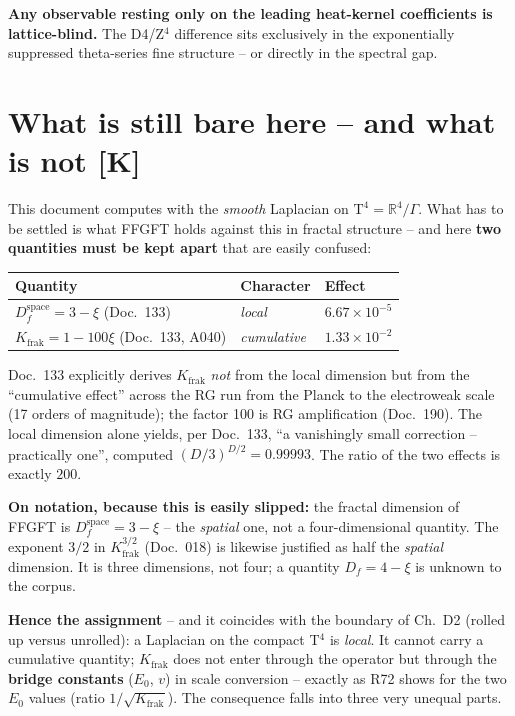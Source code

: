 \textbf{Any observable resting only on the leading heat-kernel
coefficients is lattice-blind.} The D4/Z$^4$ difference sits
exclusively in the exponentially suppressed theta-series fine
structure -- or directly in the spectral gap.

\chapter{What is still bare here -- and what is not [K]}

This document computes with the \emph{smooth} Laplacian on
$\text{T}^4 = \mathbb{R}^4/\Gamma$. What has to be settled is what
FFGFT holds against this in fractal structure -- and here
\textbf{two quantities must be kept apart} that are easily
confused:

\begin{center}
\begin{tabular}{lll}
\toprule
Quantity & Character & Effect \\
\midrule
$D_f^\text{space} = 3-\xi$ (Doc.~133) & \emph{local} &
  $6.67\times10^{-5}$ \\
$K_\text{frak} = 1-100\xi$ (Doc.~133, A040) & \emph{cumulative} &
  $1.33\times10^{-2}$ \\
\bottomrule
\end{tabular}
\end{center}

\noindent Doc.~133 explicitly derives $K_\text{frak}$ \emph{not}
from the local dimension but from the \enquote{cumulative effect}
across the RG run from the Planck to the electroweak scale (17
orders of magnitude); the factor 100 is RG amplification
(Doc.~190). The local dimension alone yields, per Doc.~133,
\enquote{a vanishingly small correction -- practically one},
computed $(D/3)^{D/2} = 0.99993$. The ratio of the two effects is
exactly $200$.

\textbf{On notation, because this is easily slipped:} the fractal
dimension of FFGFT is $D_f^\text{space} = 3-\xi$ -- the
\emph{spatial} one, not a four-dimensional quantity. The exponent
$3/2$ in $K_\text{frak}^{3/2}$ (Doc.~018) is likewise justified as
half the \emph{spatial} dimension. It is three dimensions, not
four; a quantity $D_f = 4-\xi$ is unknown to the corpus.

\textbf{Hence the assignment} -- and it coincides with the
boundary of Ch.~D2 (rolled up versus unrolled): a Laplacian on the
compact T$^4$ is \emph{local}. It cannot carry a cumulative
quantity; $K_\text{frak}$ does not enter through the operator but
through the \textbf{bridge constants} ($E_0$, $v$) in scale
conversion -- exactly as R72 shows for the two $E_0$ values
(ratio $1/\sqrt{K_\text{frak}}$). The consequence falls into
three very unequal parts.

